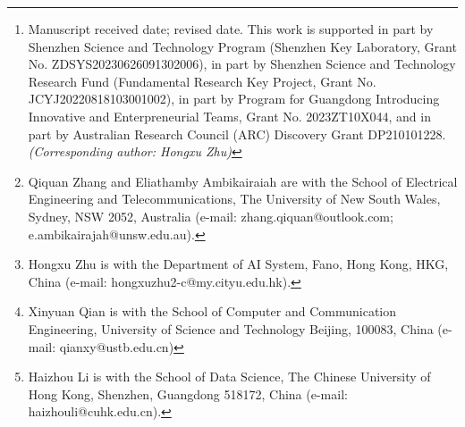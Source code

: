 \documentclass[journal]{IEEEtran}
\begin{document}
\author{Qiquan~Zhang,~
        Hongxu Zhu,~
        Xinyuan Qian,~
        Eliathamby Ambikairajah,~ 
        and Haizhou Li,~
\thanks{Manuscript received date; revised date. 
This work is supported in part by Shenzhen Science and Technology Program (Shenzhen Key Laboratory, Grant No. ZDSYS20230626091302006), in part by Shenzhen Science and Technology Research Fund (Fundamental Research Key Project, Grant No. JCYJ20220818103001002), in part by Program for Guangdong Introducing Innovative and Enterpreneurial Teams, Grant No. 2023ZT10X044, and in part by Australian Research Council (ARC) Discovery Grant DP210101228. \textit{(Corresponding author: Hongxu Zhu)}}
\thanks{Qiquan Zhang and Eliathamby Ambikairaiah are with the School of Electrical Engineering and Telecommunications, The University of New South Wales, Sydney, NSW 2052, Australia (e-mail: {zhang.qiquan}@outlook.com; {e.ambikairajah}@unsw.edu.au).}
\thanks{Hongxu Zhu is with the Department of AI System, Fano, Hong Kong, HKG, China (e-mail: {hongxuzhu2-c}@my.cityu.edu.hk).}
\thanks{Xinyuan Qian is with the School of Computer and Communication Engineering, University of Science and Technology Beijing, 100083, China (e-mail: {qianxy}@ustb.edu.cn)}
\thanks{Haizhou Li is with the School of Data Science, The Chinese University of Hong Kong, Shenzhen, Guangdong 518172, China (e-mail: {haizhouli}@cuhk.edu.cn).
}

}
\end{document}
